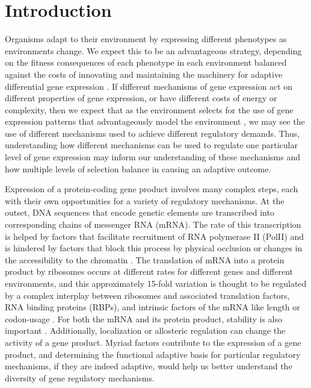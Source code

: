 \chapter{Introduction}

Organisms adapt to their environment 
by expressing different phenotypes 
as environments change. 
We expect this to be an advantageous strategy, 
depending on the fitness consequences of 
each phenotype in each environment 
balanced against the costs of innovating and maintaining
the machinery for adaptive differential gene expression
\parencite{kussell2005phenotypic}. 
If different mechanisms of gene expression act on different properties
of gene expression, or have different costs of energy or complexity, 
then we expect that as the environment selects for the use of 
gene expression patterns that advantageously model the environment
\parencite{tagkopoulos2008predictive}, we may see the use of different
mechanisms used to achieve different regulatory demands.
Thus, understanding how different mechanisms can be used to
regulate one particular level of gene expression may inform our 
understanding of these mechanisms and how multiple levels of selection 
balance in causing an adaptive outcome.

Expression of a protein-coding gene
product involves many complex steps, each with their own opportunities
for a variety of regulatory mechanisms. At the outset, DNA sequences
that encode genetic elements are transcribed into corresponding chains
of messenger RNA (mRNA). The rate of this transcription is helped by
factors that facilitate recruitment of RNA polymerase II (PolII)
and is hindered by factors that block this process by physical
occlusion or changes in the accessibility to the chromatin 
\parencite{hahn2011transcriptional}. 
The translation of mRNA into a protein product by
ribosomes occurs at different rates for different genes and different
environments, and this approximately 15-fold variation 
\parencite{weinberg2016improved} is thought to be 
regulated by a complex interplay between ribosomes and
associated translation factors, RNA binding proteins (RBPs), and
intrinsic factors of the mRNA like length or codon-usage 
\parencite{dever2016mechanism}.
For both the mRNA and its protein product, stability is also
important \parencite{perez2013eukaryotic,mcmanus2015next}. 
Additionally, localization or allosteric regulation can change
the activity of a gene product. Myriad factors contribute to the
expression of a gene product, and determining the functional adaptive
basis for particular regulatory mechanisms, if they are indeed
adaptive, would help us better understand the diversity of gene
regulatory mechanisms.

